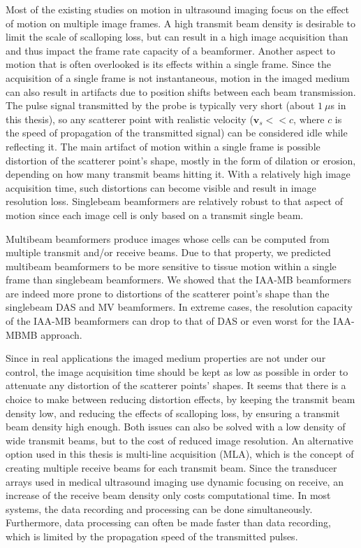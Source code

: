 Most of the existing studies on motion in ultrasound imaging focus on the effect of motion on multiple image frames.
A high transmit beam density is desirable to limit the scale of scalloping loss, but can result in a high image acquisition than and thus impact the frame rate capacity of a beamformer.
Another aspect to motion that is often overlooked is its effects within a single frame.
Since the acquisition of a single frame is not instantaneous, motion in the imaged medium can also result in artifacts due to position shifts between each beam transmission.
The pulse signal transmitted by the probe is typically very short (about $1~\mu$s in this thesis), so any scatterer point with realistic velocity ($\boldsymbol{v}_s << c$, where $c$ is the speed of propagation of the transmitted signal) can be considered idle while reflecting it.
The main artifact of motion within a single frame is possible distortion of the scatterer point's shape, mostly in the form of dilation or erosion, depending on how many transmit beams hitting it.
With a relatively high image acquisition time, such distortions can become visible and result in image resolution loss.
Singlebeam beamformers are relatively robust to that aspect of motion since each image cell is only based on a transmit single beam.

Multibeam beamformers produce images whose cells can be computed from multiple transmit and/or receive beams. Due to that property, we predicted multibeam beamformers to be more sensitive to tissue motion within a single frame than singlebeam beamformers.
We showed that the IAA-MB beamformers are indeed more prone to distortions of the scatterer point's shape than the singlebeam DAS and MV beamformers.
In extreme cases, the resolution capacity of the IAA-MB beamformers can drop to that of DAS or even worst for the IAA-MBMB approach.

Since in real applications the imaged medium properties are not under our control, the image acquisition time should be kept as low as possible in order to attenuate any distortion of the scatterer points' shapes.
It seems that there is a choice to make between reducing distortion effects, by keeping the transmit beam density low, and reducing the effects of scalloping loss, by ensuring a transmit beam density high enough. Both issues can also be solved with a low density of wide transmit beams, but to the cost of reduced image resolution.
An alternative option used in this thesis is multi-line acquisition (MLA), which is the concept of creating multiple receive beams for each transmit beam.
Since the transducer arrays used in medical ultrasound imaging use dynamic focusing on receive, an increase of the receive beam density only costs computational time.
In most systems, the data recording and processing can be done simultaneously. Furthermore, data processing can often be made faster than data recording, which is limited by the propagation speed of the transmitted pulses.

